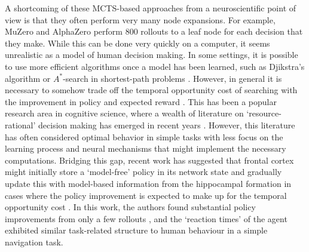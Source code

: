 

A shortcoming of these MCTS-based approaches from a neuroscientific point of view is that they often perform very many node expansions.
For example, MuZero and AlphaZero perform 800 rollouts to a leaf node for each decision that they make.
While this can be done very quickly on a computer, it seems unrealistic as a model of human decision making.
In some settings, it is possible to use more efficient algorithms once a model has been learned, such as Djikstra's algorithm or $A^*$-search in shortest-path problems \citep{hart1968formal}.
However, in general it is necessary to somehow trade off the temporal opportunity cost of searching with the improvement in policy and expected reward \citep{botvinick2014computational}.
This has been a popular research area in cognitive science, where a wealth of literature on `resource-rational' decision making has emerged in recent years \citep{griffiths2019doing,callaway2022rational}.
However, this literature has often considered optimal behavior in simple tasks with less focus on the learning process and neural mechanisms that might implement the necessary computations.
Bridging this gap, recent work has suggested that frontal cortex might initially store a `model-free' policy in its network state and gradually update this with model-based information from the hippocampal formation in cases where the policy improvement is expected to make up for the temporal opportunity cost \citep{jensen2023recurrent}.
In this work, the authors found substantial policy improvements from only a few rollouts \citep{vul2014one}, and the `reaction times' of the agent exhibited similar task-related structure to human behaviour in a simple navigation task.

